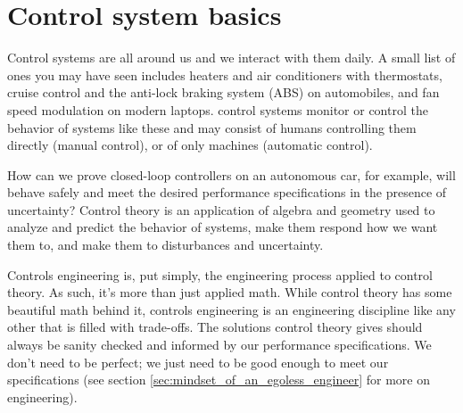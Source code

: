 
\chapter{Control system basics}

Control systems are all around us and we interact with them daily. A small list
of ones you may have seen includes heaters and air conditioners with
thermostats, cruise control and the anti-lock braking system (ABS) on
automobiles, and fan speed modulation on modern laptops. \Glspl{control system}
monitor or control the behavior of \glspl{system} like these and may consist of
humans controlling them directly (manual control), or of only machines
(automatic control).

How can we prove closed-loop \glspl{controller} on an autonomous car, for
example, will behave safely and meet the desired performance specifications in
the presence of uncertainty? Control theory is an application of algebra and
geometry used to analyze and predict the behavior of \glspl{system}, make them
respond how we want them to, and make them  to
\glspl{disturbance} and uncertainty.

Controls engineering is, put simply, the engineering process applied to control
theory. As such, it's more than just applied math. While control theory has some
beautiful math behind it, controls engineering is an engineering discipline like
any other that is filled with trade-offs. The solutions control theory gives
should always be sanity checked and informed by our performance specifications.
We don't need to be perfect; we just need to be good enough to meet our
specifications (see section \ref{sec:mindset_of_an_egoless_engineer} for more on
engineering).

\renewcommand*{\chapterpath}{\partpath/control-system-basics}




